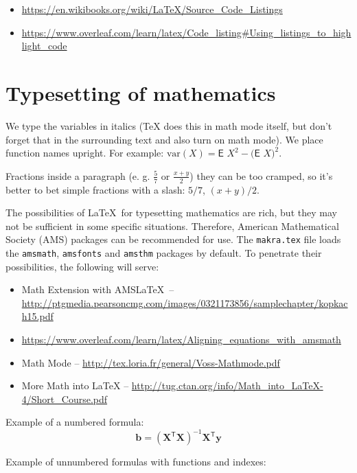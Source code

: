 \begin{itemize}
\sloppy
\item \url{https://en.wikibooks.org/wiki/LaTeX/Source_Code_Listings}
\item \url{https://www.overleaf.com/learn/latex/Code_listing#Using_listings_to_highlight_code}
\end{itemize}


\section{Typesetting of mathematics}

We type the variables in italics (\TeX{} does this in math mode itself, but 
don't forget that in the surrounding text and also turn on math mode). We place 
function names upright. For example:
$\textrm{var} (X) = \textsf{E~} X^2 - \bigl(\textsf{E~} X \bigr)^2$.

Fractions inside a paragraph (e. g. $\frac{5}{7}$ or $\frac{x+y}{2}$) they can 
be too cramped, so it's better to bet simple fractions with a slash: $5/7$, 
$(x+y)/2$.

The possibilities of \LaTeX\ for typesetting mathematics are rich, but they may 
not be sufficient in some specific situations. Therefore, American Mathematical 
Society (AMS) packages can be recommended for use. The \texttt{makra.tex} file 
loads the \texttt{amsmath}, \texttt{amsfonts} and \texttt{amsthm} packages 
by default. To penetrate their possibilities, the following will serve:

\begin{itemize}
\item Math Extension with AMS\LaTeX\ -- \url{http://ptgmedia.pearsoncmg.com/images/0321173856/samplechapter/kopkach15.pdf}
\item \url{https://www.overleaf.com/learn/latex/Aligning_equations_with_amsmath}
\item Math Mode -- \url{http://tex.loria.fr/general/Voss-Mathmode.pdf}
\item More Math into LaTeX -- \url{http://tug.ctan.org/info/Math_into_LaTeX-4/Short_Course.pdf}
\end{itemize}

Example of a numbered formula:
\begin{equation}
\mathbf{b}=(\mathbf{X}^\mathsf{T}\mathbf{X})^{-1}\mathbf{X}^\mathsf{T}\mathbf{y}
\end{equation}

Example of unnumbered formulas with functions and indexes:

